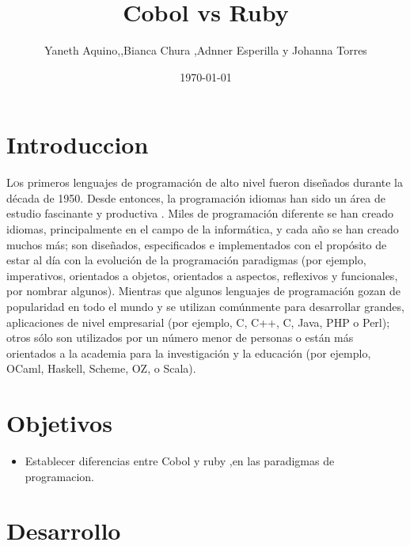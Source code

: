 \documentclass[twoside,twocolumn]{article}
\title{ Cobol vs Ruby} %
\author{Yaneth Aquino,,Bianca Chura ,Adnner Esperilla y Johanna Torres}
\date{\today} %
\begin{document}
\maketitle


\section{Introduccion}

\lettrine[nindent=0em,lines=3]{L}os primeros lenguajes de programación de alto nivel fueron diseñados durante la década de 1950. Desde entonces, la programación
idiomas han sido un área de estudio fascinante y productiva . Miles de programación diferente
se han creado idiomas, principalmente en el campo de la informática, y cada año se han creado muchos más; son
diseñados, especificados e implementados con el propósito de estar al día con la evolución de la programación
paradigmas (por ejemplo, imperativos, orientados a objetos, orientados a aspectos, reflexivos y funcionales, por nombrar algunos).
Mientras que algunos lenguajes de programación gozan de popularidad en todo el mundo y se utilizan comúnmente para desarrollar grandes,
aplicaciones de nivel empresarial (por ejemplo, C, C++, C, Java, PHP o Perl); otros sólo son utilizados por un número menor de
personas o están más orientados a la academia para la investigación y la educación (por ejemplo, OCaml, Haskell, Scheme, OZ, o
Scala).

\section{Objetivos}
\begin{itemize}
\item Establecer diferencias entre Cobol y ruby ,en las paradigmas de programacion.

\end{itemize}

\section{Desarrollo}
\end{document}
